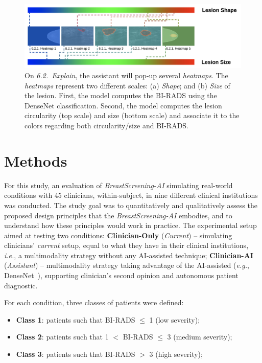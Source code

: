 \begin{figure}[htbp]
\centering
\includegraphics[width=\columnwidth]{images/fig032}
\caption{On {\it 6.2.~Explain}, the assistant will pop-up several {\it heatmaps}. The {\it heatmaps} represent two different scales: (a) {\it Shape}; and (b) {\it Size} of the lesion. First, the model computes the BI-RADS using the DenseNet classification. Second, the model computes the lesion circularity (top scale) and size (bottom scale) and associate it to the colors regarding both circularity/size and BI-RADS.}
\label{fig:fig032}
\end{figure}

\section{Methods}
\label{sec:chap005005}

For this study, an evaluation of {\it BreastScreening-AI} simulating real-world conditions with 45 clinicians, within-subject, in nine different clinical institutions was conducted.
The study goal was to quantitatively and qualitatively assess the proposed design principles that the {\it BreastScreening-AI} embodies, and to understand how these principles would work in practice.
The experimental setup aimed at testing two conditions: {\bf Clinician-Only} ({\it Current}) -- simulating clinicians' {\it current} setup, equal to what they have in their clinical institutions, {\it i.e.}, a multimodality strategy without any \ac{AI}-assisted technique; {\bf Clinician-AI} ({\it Assistant}) -- multimodality strategy taking advantage of the \ac{AI}-assisted ({\it e.g.}, DenseNet~\cite{9098470}), supporting clinician's second opinion and autonomous patient diagnostic.

\vspace{2.00mm}

\noindent
For each condition, three classes of patients were defined:

\begin{itemize}
\item {\bf Class 1}: patients such that \ac{BI-RADS} $\leq$ 1 (low severity);
\item {\bf Class 2}: patients such that 1 $<$ \ac{BI-RADS} $\leq$ 3 (medium severity);
\item {\bf Class 3}: patients such that \ac{BI-RADS} $>$ 3 (high severity);
\end{itemize}

